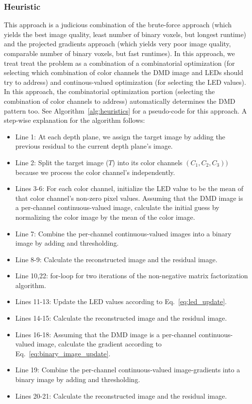 \subsubsection{Heuristic}
\label{sec:acd_heuristis}
This approach is a judicious combination of the brute-force approach (which yields the best image quality, least number of binary voxels, but longest runtime) and the projected gradients approach (which yields very poor image quality, comparable number of binary voxels, but fast runtimes). 
In this approach, we treat treat the problem as a combination of a combinatorial optimization (for selecting which combination of color channels the DMD image and LEDs should try to address) and continous-valued optimization (for selecting the LED values). 
In this approach, the combinatorial optimization portion (selecting the combination of color channels to address) automatically determines the DMD pattern too.
See Algorithm~\ref{alg:heuristics} for a pseudo-code for this approach. A step-wise explanation for the algorithm follows:
\begin{itemize}
    \item Line 1: At each depth plane, we assign the target image by adding the previous residual to the current depth plane's image. 
    \item Line 2: Split the target image ($T$) into its color channels $(C_1, C_2, C_3))$ because we process the color channel's independently.
    \item Lines 3-6: For each color channel, initialize the LED value to be the mean of that color channel's non-zero pixel values. Assuming that the DMD image is a per-channel continuous-valued image, calculate the initial guess by normalizing the color image by the mean of the color image.  
    \item Line 7: Combine the per-channel continuous-valued images into a binary image by adding and thresholding. 
    \item Line 8-9: Calculate the reconstructed image and the residual image.
    \item Line 10,22: for-loop for two iterations of the non-negative matrix factorization algorithm.
    \item Lines 11-13: Update the LED values according to Eq.~\ref{eq:led_update}.
    \item Lines 14-15: Calculate the reconstructed image and the residual image.
    \item Lines 16-18: Assuming that the DMD image is a per-channel continuous-valued image, calculate the gradient according to Eq.~\ref{eq:binary_image_update}.
    \item Line 19: Combine the per-channel continuous-valued image-gradients into a binary image by adding and thresholding.
    \item Lines 20-21: Calculate the reconstructed image and the residual image.
\end{itemize}

